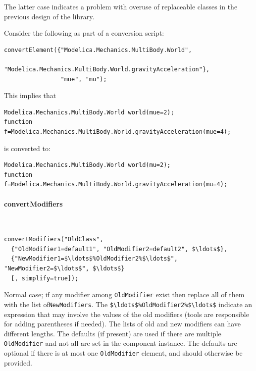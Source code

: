 \begin{nonnormative}
The latter case indicates a problem with overuse of replaceable classes in the previous design of the library.
\end{nonnormative}

\begin{example}
Consider the following as part of a conversion script:
\begin{lstlisting}[language=modelica]
convertElement({"Modelica.Mechanics.MultiBody.World",
                "Modelica.Mechanics.MultiBody.World.gravityAcceleration"},
                "mue", "mu");
\end{lstlisting}
This implies that
\begin{lstlisting}[language=modelica]
Modelica.Mechanics.MultiBody.World world(mue=2);
function f=Modelica.Mechanics.MultiBody.World.gravityAcceleration(mue=4);
\end{lstlisting}
is converted to:
\begin{lstlisting}[language=modelica]
Modelica.Mechanics.MultiBody.World world(mu=2);
function f=Modelica.Mechanics.MultiBody.World.gravityAcceleration(mu=4);
\end{lstlisting}
\end{example}

\paragraph*{convertModifiers}\label{convertmodifiers}
\ %

\begin{lstlisting}[language=modelica]
convertModifiers("OldClass",
  {"OldModifier1=default1", "OldModifier2=default2", $\ldots$},
  {"NewModifier1=$\ldots$%OldModifier2%$\ldots$", "NewModifier2=$\ldots$", $\ldots$}
  [, simplify=true]);
\end{lstlisting}

Normal case; if any modifier among \lstinline!OldModifier! exist then replace all of them with the list of\linebreak[4] \lstinline!NewModifiers!.
The \lstinline!$\ldots$%OldModifier2%$\ldots$! indicate an expression that may involve the values of the old modifiers (tools are responsible for adding parentheses if needed).
The lists of old and new modifiers can have different lengths.
The defaults (if present) are used if there are multiple \lstinline!OldModifier! and not all are set in the component instance.
The defaults are optional if there is at most one \lstinline!OldModifier! element, and should otherwise be provided.


